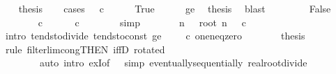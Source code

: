 \begin{isabellebody}
\isanewline
\ \ \isamarkupfalse%
\ {\isacharquery}{\kern0pt}thesis\isanewline
\ \ \isamarkupfalse%
\ {\isacharparenleft}{\kern0pt}cases\ {\isachardoublequoteopen}{}\ {\isasymle}\ c{\isachardoublequoteclose}{\isacharparenright}{\kern0pt}\isanewline
\ \ \ \ \isamarkupfalse%
\ True\isanewline
\ \ \ \ \isamarkupfalse%
\ ge{\isacharunderscore}{\kern0pt}{}\ \isamarkupfalse%
\ {\isacharquery}{\kern0pt}thesis\ \isamarkupfalse%
\ blast\isanewline
\ \ \isamarkupfalse%
\isanewline
\ \ \ \ \isamarkupfalse%
\ False\isanewline
\ \ \ \ \isamarkupfalse%
\ {\isacartoucheopen}{}\ {\isacharless}{\kern0pt}\ c{\isacartoucheclose}\ \isamarkupfalse%
\ {\isachardoublequoteopen}{}\ {\isasymle}\ {}\ {\isacharslash}{\kern0pt}\ c{\isachardoublequoteclose}\isanewline
\ \ \ \ \ \ \isamarkupfalse%
\ simp\isanewline
\ \ \ \ \isamarkupfalse%
\ \isamarkupfalse%
\ {\isachardoublequoteopen}{\isacharparenleft}{\kern0pt}{\isasymlambda}n{\isachardot}{\kern0pt}\ {}\ {\isacharslash}{\kern0pt}\ root\ n\ {\isacharparenleft}{\kern0pt}{}\ {\isacharslash}{\kern0pt}\ c{\isacharparenright}{\kern0pt}{\isacharparenright}{\kern0pt}\ {\isasymlonglonglongrightarrow}\ {}\ {\isacharslash}{\kern0pt}\ {}{\isachardoublequoteclose}\isanewline
\ \ \ \ \ \ \isamarkupfalse%
\ {\isacharparenleft}{\kern0pt}intro\ tendsto{\isacharunderscore}{\kern0pt}divide\ tendsto{\isacharunderscore}{\kern0pt}const\ ge{\isacharunderscore}{\kern0pt}{}\ {\isacartoucheopen}{}\ {\isasymle}\ {}\ {\isacharslash}{\kern0pt}\ c{\isacartoucheclose}\ one{\isacharunderscore}{\kern0pt}neq{\isacharunderscore}{\kern0pt}zero{\isacharparenright}{\kern0pt}\isanewline
\ \ \ \ \isamarkupfalse%
\ \isamarkupfalse%
\ {\isacharquery}{\kern0pt}thesis\isanewline
\ \ \ \ \ \ \isamarkupfalse%
\ {\isacharparenleft}{\kern0pt}rule\ filterlim{\isacharunderscore}{\kern0pt}cong{\isacharbrackleft}{\kern0pt}THEN\ iffD{}{\isacharcomma}{\kern0pt}\ rotated\ {}{\isacharbrackright}{\kern0pt}{\isacharparenright}{\kern0pt}\isanewline
\ \ \ \ \ \ \ \ {\isacharparenleft}{\kern0pt}auto\ intro{\isacharbang}{\kern0pt}{\isacharcolon}{\kern0pt}\ exI{\isacharbrackleft}{\kern0pt}of\ {\isacharunderscore}{\kern0pt}\ {}{\isacharbrackright}{\kern0pt}\ simp{\isacharcolon}{\kern0pt}\ eventually{\isacharunderscore}{\kern0pt}sequentially\ real{\isacharunderscore}{\kern0pt}root{\isacharunderscore}{\kern0pt}divide{\isacharparenright}{\kern0pt}\isanewline

\end{isabellebody}
